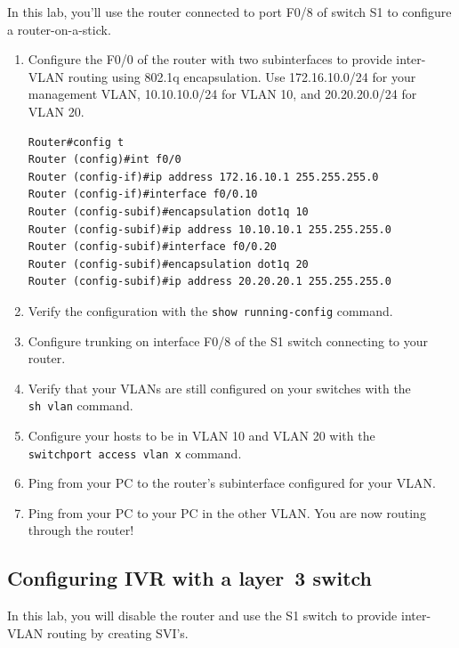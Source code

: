 \documentclass[b5paper,11pt]{memoir}
\begin{document}
In this lab, you'll use the router connected to port F0/8 of switch S1
to configure a router-on-a-stick.

\begin{enumerate}
\item
  Configure the F0/0 of the router with two subinterfaces to provide
  inter-VLAN routing using 802.1q encapsulation. Use 172.16.10.0/24 for
  your management VLAN, 10.10.10.0/24 for VLAN 10, and 20.20.20.0/24 for
  VLAN 20.

\begin{verbatim}
Router#config t
Router (config)#int f0/0
Router (config-if)#ip address 172.16.10.1 255.255.255.0
Router (config-if)#interface f0/0.10
Router (config-subif)#encapsulation dot1q 10
Router (config-subif)#ip address 10.10.10.1 255.255.255.0
Router (config-subif)#interface f0/0.20
Router (config-subif)#encapsulation dot1q 20
Router (config-subif)#ip address 20.20.20.1 255.255.255.0
\end{verbatim}
\item
  Verify the configuration with the \texttt{show\ running-config}
  command.
\item
  Configure trunking on interface F0/8 of the S1 switch connecting to
  your router.
\item
  Verify that your VLANs are still configured on your switches with the
  \texttt{sh\ vlan} command.
\item
  Configure your hosts to be in VLAN 10 and VLAN 20 with the
  \texttt{switchport\ access\ vlan\ x} command.
\item
  Ping from your PC to the router's subinterface configured for your
  VLAN.
\item
  Ping from your PC to your PC in the other VLAN. You are now routing
  through the router!
\end{enumerate}

\subsection{Configuring IVR with a layer~3 switch}

In this lab, you will disable the router and use the S1 switch to
provide inter-VLAN routing by creating SVI's.
\end{document}
